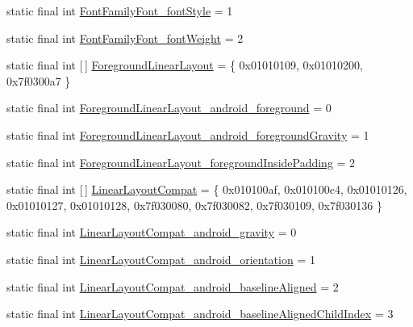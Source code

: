 \begin{DoxyCompactItemize}
static final int \mbox{\hyperlink{classandroid_1_1support_1_1design_1_1R_1_1styleable_a635ace782af7a8d713d5954f5075b7ac}{Font\+Family\+Font\+\_\+font\+Style}} = 1
\item 
static final int \mbox{\hyperlink{classandroid_1_1support_1_1design_1_1R_1_1styleable_a045975bab557da3700497d30821aac08}{Font\+Family\+Font\+\_\+font\+Weight}} = 2
\item 
static final int \mbox{[}$\,$\mbox{]} \mbox{\hyperlink{classandroid_1_1support_1_1design_1_1R_1_1styleable_a423286315758e65de84a49f81984f19a}{Foreground\+Linear\+Layout}} = \{ 0x01010109, 0x01010200, 0x7f0300a7 \}
\item 
static final int \mbox{\hyperlink{classandroid_1_1support_1_1design_1_1R_1_1styleable_affe83e52e282d73f28e9e8adee61607c}{Foreground\+Linear\+Layout\+\_\+android\+\_\+foreground}} = 0
\item 
static final int \mbox{\hyperlink{classandroid_1_1support_1_1design_1_1R_1_1styleable_a4dba2129ba63c29dc9680f2b57392af7}{Foreground\+Linear\+Layout\+\_\+android\+\_\+foreground\+Gravity}} = 1
\item 
static final int \mbox{\hyperlink{classandroid_1_1support_1_1design_1_1R_1_1styleable_aec964b6f08ec7f414cf1fe5528278a0d}{Foreground\+Linear\+Layout\+\_\+foreground\+Inside\+Padding}} = 2
\item 
static final int \mbox{[}$\,$\mbox{]} \mbox{\hyperlink{classandroid_1_1support_1_1design_1_1R_1_1styleable_a00b7e2da5bc1f659d80ac76716119713}{Linear\+Layout\+Compat}} = \{ 0x010100af, 0x010100c4, 0x01010126, 0x01010127, 0x01010128, 0x7f030080, 0x7f030082, 0x7f030109, 0x7f030136 \}
\item 
static final int \mbox{\hyperlink{classandroid_1_1support_1_1design_1_1R_1_1styleable_a94fd5dcf64b530191f4c13699d3f209c}{Linear\+Layout\+Compat\+\_\+android\+\_\+gravity}} = 0
\item 
static final int \mbox{\hyperlink{classandroid_1_1support_1_1design_1_1R_1_1styleable_ac3216c909a53d0d655295199b5db8bcc}{Linear\+Layout\+Compat\+\_\+android\+\_\+orientation}} = 1
\item 
static final int \mbox{\hyperlink{classandroid_1_1support_1_1design_1_1R_1_1styleable_a22effd7a7321cd1d30a0fdf070aa0fd9}{Linear\+Layout\+Compat\+\_\+android\+\_\+baseline\+Aligned}} = 2
\item 
static final int \mbox{\hyperlink{classandroid_1_1support_1_1design_1_1R_1_1styleable_a3709324492722be4a6bb1ec413a0b65c}{Linear\+Layout\+Compat\+\_\+android\+\_\+baseline\+Aligned\+Child\+Index}} = 3
\item 

\end{DoxyCompactItemize}
